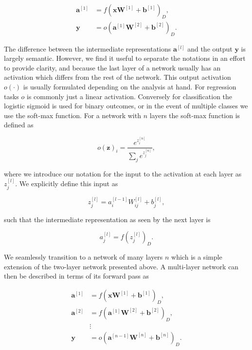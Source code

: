 \begin{align}
\mathbf{a}^{[1]} &= f(\mathbf{x}\mathbf{W}^{[1]}+ \mathbf{b}^{[1]})_D , \\
\mathbf{y} &= o(\mathbf{a}^{[1]}\mathbf{W}^{[2]} + \mathbf{b}^{[2]})_D .
\end{align}  

\noindent The difference between the intermediate representations $\mathbf{a}^{[l]}$ and the output $\mathbf{y}$ is largely semantic. However, we find it useful to separate the notations in an effort to provide clarity, and because the last layer of a network usually has an activation which differs from the rest of the network. This output activation $o(\cdot)$ is usually formulated depending on the analysis at hand. For regression tasks $o$ is commonly just a linear activation. Conversely for classification the logistic sigmoid is used for binary outcomes, or in the event of multiple classes we use the soft-max function. For a network with $n$ layers the soft-max function is defined as 

\begin{equation}\label{eq:softmax}
o(\mathbf{z})_i = \frac{e^{z_i^{[n]}}}{\sum_j e^{z_j^{[n]}}},
\end{equation}

\noindent where we introduce our notation for the input to the activation at each layer as $z_j^{[l]}$. We explicitly define this input as 

\begin{equation}\label{eq:fwd_multi}
	z_{j}^{[l]} = a^{[l-1]}_iW^{[l]}_{ij} + b^{[l]}_j,
\end{equation}

\noindent such that the intermediate representation as seen by the next layer is

\begin{equation}\label{eq:z}
a_j ^{[l]} = f(z_j^{[l]})_D.
\end{equation}

\noindent We seamlessly transition to a network of many layers $n$ which is a simple extension of the two-layer network presented above. A multi-layer network can then be described in terms of its forward pass as 

\begin{align}
\mathbf{a}^{[1]} &= f(\mathbf{x}\mathbf{W}^{[1]}+ \mathbf{b}^{[1]})_D , \\
\mathbf{a}^{[2]} &= f(\mathbf{a}^{[1]}\mathbf{W}^{[2]}+ \mathbf{b}^{[2]})_D , \\
&\vdots \\
\mathbf{y} &= o(\mathbf{a}^{[n-1]}\mathbf{W}^{[n]} + \mathbf{b}^{[n]})_D .
\end{align} 

